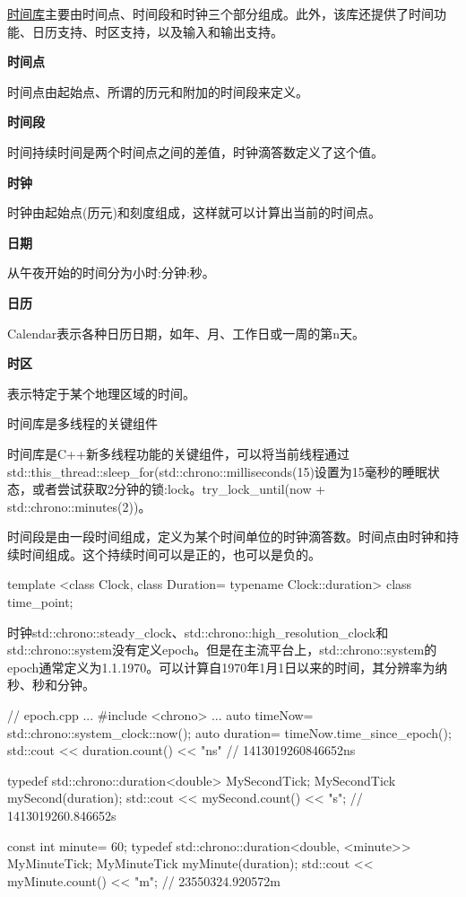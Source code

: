 \href{http://en.cppreference.com/w/cpp/header/chrono}{时间库}主要由时间点、时间段和时钟三个部分组成。此外，该库还提供了时间功能、日历支持、时区支持，以及输入和输出支持。

\noindent
\textbf{时间点}

时间点由起始点、所谓的历元和附加的时间段来定义。

\noindent
\textbf{时间段}

时间持续时间是两个时间点之间的差值，时钟滴答数定义了这个值。

\noindent
\textbf{时钟}
 
时钟由起始点(历元)和刻度组成，这样就可以计算出当前的时间点。

\noindent
\textbf{日期}

从午夜开始的时间分为小时:分钟:秒。

\noindent
\textbf{日历}

Calendar表示各种日历日期，如年、月、工作日或一周的第n天。

\noindent
\textbf{时区}

表示特定于某个地理区域的时间。

\begin{myNotic}{时间库是多线程的关键组件}
	
时间库是C++新多线程功能的关键组件，可以将当前线程通过std::this\_thread::sleep\_for(std::chrono::milliseconds(15)设置为15毫秒的睡眠状态，或者尝试获取2分钟的锁:lock。try\_lock\_until(now + std::chrono::minutes(2))。
	
\end{myNotic}



时间段是由一段时间组成，定义为某个时间单位的时钟滴答数。时间点由时钟和持续时间组成。这个持续时间可以是正的，也可以是负的。

\begin{cpp}
template <class Clock, class Duration= typename Clock::duration> class time_point;
\end{cpp}

时钟std::chrono::steady\_clock、std::chrono::high\_resolution\_clock和std::chrono::system没有定义epoch。但是在主流平台上，std::chrono::system的epoch通常定义为1.1.1970。可以计算自1970年1月1日以来的时间，其分辨率为纳秒、秒和分钟。


\begin{cpp}
// epoch.cpp
...
#include <chrono>
...
auto timeNow= std::chrono::system_clock::now();
auto duration= timeNow.time_since_epoch();
std::cout << duration.count() << "ns" // 1413019260846652ns

typedef std::chrono::duration<double> MySecondTick;
MySecondTick mySecond(duration);
std::cout << mySecond.count() << "s"; // 1413019260.846652s

const int minute= 60;
typedef std::chrono::duration<double, <minute>> MyMinuteTick;
MyMinuteTick myMinute(duration);
std::cout << myMinute.count() << "m"; // 23550324.920572m
\end{cpp}

